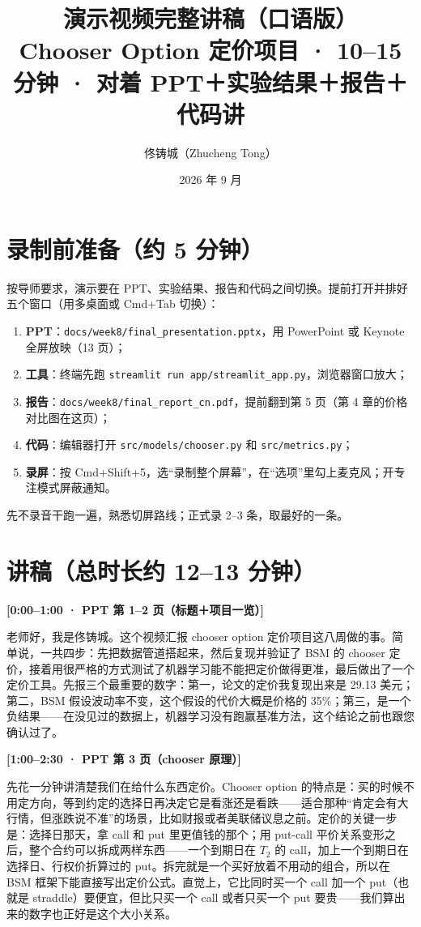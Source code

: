 \documentclass[11pt]{ctexart}
\title{\textbf{演示视频完整讲稿（口语版）}\\
\large Chooser Option 定价项目 · 10--15 分钟 · 对着 PPT＋实验结果＋报告＋代码讲}
\author{佟铸城（Zhucheng Tong）}
\date{2026 年 9 月}
\newcommand{\cue}[1]{\noindent\colorbox{gray!15}{\parbox{\dimexpr\linewidth-2\fboxsep}{\textbf{#1}}}\par\smallskip}
\begin{document}
\maketitle

\section*{录制前准备（约 5 分钟）}
按导师要求，演示要在 PPT、实验结果、报告和代码之间切换。提前打开并排好五个窗口（用多桌面或 Cmd+Tab 切换）：
\begin{enumerate}
  \item \textbf{PPT}：\texttt{docs/week8/final\_presentation.pptx}，用 PowerPoint 或 Keynote 全屏放映（13 页）；
  \item \textbf{工具}：终端先跑 \texttt{streamlit run app/streamlit\_app.py}，浏览器窗口放大；
  \item \textbf{报告}：\texttt{docs/week8/final\_report\_cn.pdf}，提前翻到第 5 页（第 4 章的价格对比图在这页）；
  \item \textbf{代码}：编辑器打开 \texttt{src/models/chooser.py} 和 \texttt{src/metrics.py}；
  \item \textbf{录屏}：按 Cmd+Shift+5，选“录制整个屏幕”，在“选项”里勾上麦克风；开专注模式屏蔽通知。
\end{enumerate}
先不录音干跑一遍，熟悉切屏路线；正式录 2--3 条，取最好的一条。

\section*{讲稿（总时长约 12--13 分钟）}

\cue{[0:00--1:00 · PPT 第 1--2 页（标题＋项目一览）]}
老师好，我是佟铸城。这个视频汇报 chooser option 定价项目这八周做的事。简单说，一共四步：先把数据管道搭起来，然后复现并验证了 BSM 的 chooser 定价，接着用很严格的方式测试了机器学习能不能把定价做得更准，最后做出了一个定价工具。先报三个最重要的数字：第一，论文的定价我复现出来是 29.13 美元；第二，BSM 假设波动率不变，这个假设的代价大概是价格的 35\%；第三，是一个负结果——在没见过的数据上，机器学习没有跑赢基准方法，这个结论之前也跟您确认过了。

\cue{[1:00--2:30 · PPT 第 3 页（chooser 原理）]}
先花一分钟讲清楚我们在给什么东西定价。Chooser option 的特点是：买的时候不用定方向，等到约定的选择日再决定它是看涨还是看跌——适合那种“肯定会有大行情，但涨跌说不准”的场景，比如财报或者美联储议息之前。定价的关键一步是：选择日那天，拿 call 和 put 里更值钱的那个；用 put-call 平价关系变形之后，整个合约可以拆成两样东西——一个到期日在 $T_2$ 的 call，加上一个到期日在选择日、行权价折算过的 put。拆完就是一个买好放着不用动的组合，所以在 BSM 框架下能直接写出定价公式。直觉上，它比同时买一个 call 加一个 put（也就是 straddle）要便宜，但比只买一个 call 或者只买一个 put 要贵——我们算出来的数字也正好是这个大小关系。
\end{document}

